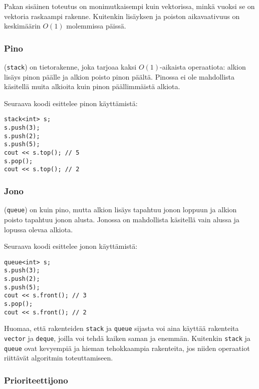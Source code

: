 Pakan sisäinen toteutus on monimutkaisempi kuin
vektorissa, minkä vuoksi se on
vektoria raskaampi rakenne.
Kuitenkin lisäyksen ja poiston
aikavaativuus on keskimäärin $O(1)$ molemmissa päissä.

\subsubsection{Pino}


 (\texttt{stack}) on tietorakenne,
joka tarjoaa kaksi $O(1)$-aikaista
operaatiota:
alkion lisäys pinon päälle ja alkion
poisto pinon päältä.
Pinossa ei ole mahdollista käsitellä muita
alkioita kuin pinon päällimmäistä alkiota.

Seuraava koodi esittelee pinon käyttämistä:

\begin{lstlisting}
stack<int> s;
s.push(3);
s.push(2);
s.push(5);
cout << s.top(); // 5
s.pop();
cout << s.top(); // 2
\end{lstlisting}
\subsubsection{Jono}


 (\texttt{queue}) on kuin pino,
mutta alkion lisäys tapahtuu jonon loppuun
ja alkion poisto tapahtuu jonon alusta.
Jonossa on mahdollista käsitellä vain
alussa ja lopussa olevaa alkiota.

Seuraava koodi esittelee jonon käyttämistä:

\begin{lstlisting}
queue<int> s;
s.push(3);
s.push(2);
s.push(5);
cout << s.front(); // 3
s.pop();
cout << s.front(); // 2
\end{lstlisting}

Huomaa, että rakenteiden \texttt{stack} ja \texttt{queue}
sijasta voi aina käyttää rakenteita
\texttt{vector} ja \texttt{deque}, joilla voi
tehdä kaiken saman ja enemmän.
Kuitenkin \texttt{stack} ja \texttt{queue} ovat
kevyempiä ja hieman tehokkaampia rakenteita,
jos niiden operaatiot riittävät algoritmin toteuttamiseen.

\subsubsection{Prioriteettijono}

